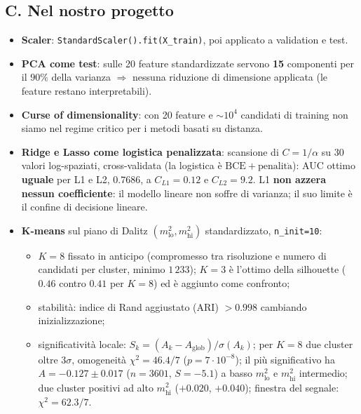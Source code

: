 \documentclass[11pt,a4paper]{article}
\newcommand{\code}[1]{\texttt{#1}}
\begin{document}
\subsection*{C. Nel nostro progetto}
\begin{itemize}
\item \textbf{Scaler}: \code{StandardScaler().fit(X\_train)}, poi applicato a validation e test.
\item \textbf{PCA come test}: sulle 20 feature standardizzate servono \textbf{15} componenti per il $90\%$ della varianza $\Rightarrow$ nessuna riduzione di dimensione applicata (le feature restano interpretabili).
\item \textbf{Curse of dimensionality}: con 20 feature e $\sim10^4$ candidati di training non siamo nel regime critico per i metodi basati su distanza.
\item \textbf{Ridge e Lasso come logistica penalizzata}: scansione di $C=1/\alpha$ su 30 valori log-spaziati, cross-validata (la logistica \`e $\mathrm{BCE}+\mathrm{penalit\grave a}$): AUC ottimo \textbf{uguale} per L1 e L2, $0.7686$, a $C_{L1}=0.12$ e $C_{L2}=9.2$. L1 \textbf{non azzera nessun coefficiente}: il modello lineare non soffre di varianza; il suo limite \`e il confine di decisione lineare.
\item \textbf{K-means} sul piano di Dalitz $(m^2_{\mathrm{lo}},m^2_{\mathrm{hi}})$ standardizzato, \code{n\_init=10}:
 \begin{itemize}
 \item $K=8$ fissato in anticipo (compromesso tra risoluzione e numero di candidati per cluster, minimo $1\,233$); $K=3$ \`e l'ottimo della silhouette ($0.46$ contro $0.41$ per $K=8$) ed \`e aggiunto come confronto;
 \item stabilit\`a: indice di Rand aggiustato (ARI) $>0.998$ cambiando inizializzazione;
 \item significativit\`a locale: $S_k=(A_k-A_{\mathrm{glob}})/\sigma(A_k)$; per $K=8$ due cluster oltre $3\sigma$, omogeneit\`a $\chi^2=46.4/7$ ($p=7\cdot10^{-8}$); il pi\`u significativo ha $A=-0.127\pm0.017$ ($n=3601$, $S=-5.1$) a basso $m^2_{\mathrm{lo}}$ e $m^2_{\mathrm{hi}}$ intermedio; due cluster positivi ad alto $m^2_{\mathrm{hi}}$ ($+0.020$, $+0.040$); finestra del segnale: $\chi^2=62.3/7$.
 \end{itemize}
\end{itemize}
\end{document}
